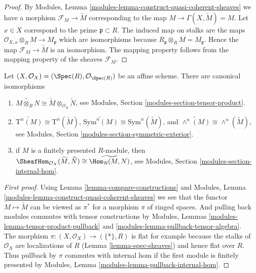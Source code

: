 \begin{proof}
By Modules, Lemma \ref{modules-lemma-construct-quasi-coherent-sheaves}
we have a morphism $\mathcal{F}_M \to \widetilde M$ corresponding
to the map $M \to \Gamma(X, \widetilde M) = M$. Let $x \in X$
correspond to the prime $\mathfrak p \subset R$.
The induced map on stalks are the maps
$\mathcal{O}_{X, x} \otimes_R M \to M_{\mathfrak p}$
which are isomorphisms because
$R_{\mathfrak p} \otimes_R M = M_{\mathfrak p}$.
Hence the map $\mathcal{F}_M \to \widetilde M$ is an isomorphism.
The mapping property follows from the mapping property of
the sheaves $\mathcal{F}_M$.
\end{proof}

\begin{lemma}
\label{lemma-widetilde-constructions}
Let $(X, \mathcal{O}_X) = (\Spec(R), \mathcal{O}_{\Spec(R)})$
be an affine scheme. There are canonical isomorphisms
\begin{enumerate}
\item
$
\widetilde{M \otimes_R N}
\cong
\widetilde M \otimes_{\mathcal{O}_X} \widetilde N
$,
see Modules, Section \ref{modules-section-tensor-product}.
\item
$
\widetilde{\text{T}^n(M)}
\cong
\text{T}^n(\widetilde M)
$,
$
\widetilde{\text{Sym}^n(M)}
\cong
\text{Sym}^n(\widetilde M)
$, and
$
\widetilde{\wedge^n(M)}
\cong
\wedge^n(\widetilde M)
$,
see
Modules, Section \ref{modules-section-symmetric-exterior}.
\item if $M$ is a finitely presented $R$-module, then
$
\SheafHom_{\mathcal{O}_X}(\widetilde M, \widetilde N)
\cong
\widetilde{\Hom_R(M,  N)}
$,
see
Modules, Section \ref{modules-section-internal-hom}.
\end{enumerate}
\end{lemma}

\begin{proof}[First proof]
Using Lemma \ref{lemma-compare-constructions} and
Modules, Lemma \ref{modules-lemma-construct-quasi-coherent-sheaves}
we see that the functor $M \mapsto \widetilde M$ can be viewed
as $\pi^*$ for a morphism $\pi$ of ringed spaces.
And pulling back modules commutes with tensor constructions by
Modules, Lemmas \ref{modules-lemma-tensor-product-pullback}
and \ref{modules-lemma-pullback-tensor-algebra}.
The morphism $\pi : (X, \mathcal{O}_X) \to (\{*\}, R)$ is
flat for example because the stalks of $\mathcal{O}_X$ are
localizations of $R$ (Lemma \ref{lemma-spec-sheaves})
and hence flat over $R$. Thus pullback by $\pi$ commutes
with internal hom if the first module is finitely presented by
Modules, Lemma \ref{modules-lemma-pullback-internal-hom}.
\end{proof}

